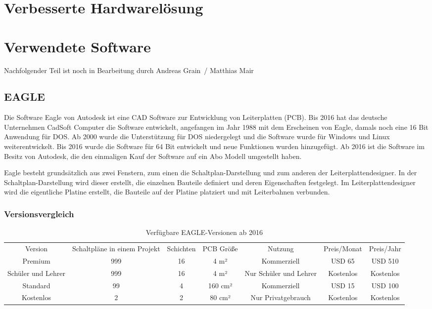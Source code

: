 \documentclass[a4paper, twoside, 12pt, openright]{memoir}
\newcommand{\AndreasGrain}{Andreas Grain}
\newcommand{\MatthiasMair}{Matthias Mair}
\newcommand{\authorName}{\AndreasGrain\ / \MatthiasMair}
\newcommand{\wip}{{\color{red}Nachfolgender Teil ist noch in Bearbeitung durch \authorName}}
\begin{document}
\chapter{Verbesserte Hardwarelösung}

\chapter{Verwendete Software}
\wip
\section{EAGLE}
Die Software Eagle von Autodesk ist eine CAD Software zur Entwicklung von Leiterplatten (PCB).
Bis 2016 hat das deutsche Unternehmen CadSoft Computer die Software entwickelt, angefangen im Jahr 1988 mit dem Erscheinen von Eagle, damals noch eine 16 Bit Anwendung für DOS.
Ab 2000 wurde die Unterstützung für DOS niedergelegt und die Software wurde für Windows und Linux weiterentwickelt.
Bis 2016 wurde die Software für 64 Bit entwickelt und neue Funktionen wurden hinzugefügt.
Ab 2016 ist die Software im Besitz von Autodesk, die den einmaligen Kauf der Software auf ein Abo Modell umgestellt haben.\par

Eagle besteht grundsätzlich aus zwei Fenstern, zum einen die Schaltplan-Darstellung und zum anderen der Leiterplattendesigner.
In der Schaltplan-Darstellung wird dieser erstellt, die einzelnen Bauteile definiert und deren Eigenschaften festgelegt.
Im Leiterplattendesigner wird die eigentliche Platine erstellt, die Bauteile auf der Platine platziert und mit Leiterbahnen verbunden.
\subsection{Versionsvergleich}
\begin{table}
	\centering
	\begin{tabular}{|c|c|c|c|c|c|c|}
		Version&Schaltpläne in einem Projekt&Schichten&PCB Größe&Nutzung&Preis/Monat&Preis/Jahr\\
		Premium&999&16&4 m²&Kommerziell&USD 65&USD 510\\
		Schüler und Lehrer&999&16&4 m²&Nur Schüler und Lehrer&Kostenlos&Kostenlos\\
		Standard&99&4&160 cm²&Kommerziell&USD 15&USD 100\\
		Kostenlos&2&2&80 cm²&Nur Privatgebrauch&Kostenlos&Kostenlos
	\end{tabular}
	\caption{Verfügbare EAGLE-Versionen ab 2016}
\end{table}
\end{document}
